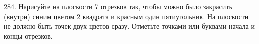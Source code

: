 284. Нарисуйте на плоскости 7 отрезков так, чтобы можно было закрасить (внутри) синим цветом 2 квадрата и красным один пятиугольник. На плоскости не должно быть точек двух цветов сразу. Отметьте точками или буквами начала и концы отрезков.\\
